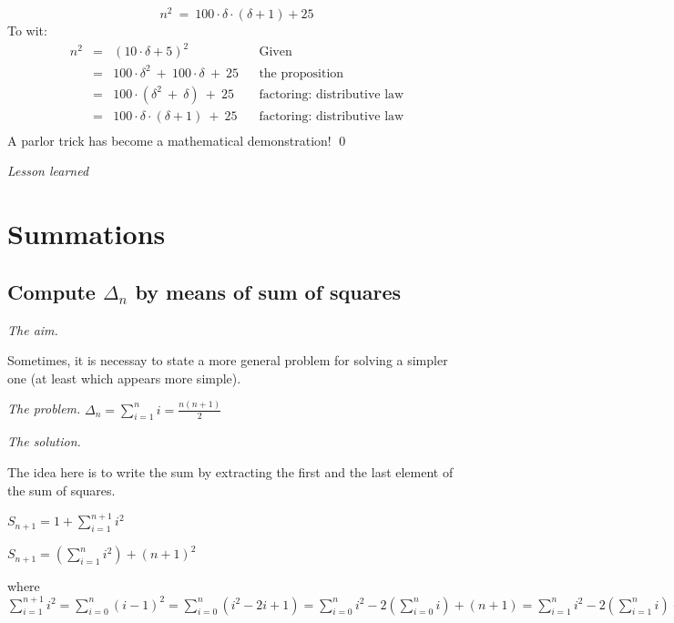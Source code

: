 \[ n^2 \ = \ 100 \cdot \delta \cdot (\delta+1) + 25 \]
To wit: 
\[
\begin{array}{lclll}
n^2 & = & (10 \cdot \delta + 5)^2 & & \mbox{Given} \\
    & = & 100 \cdot \delta^2 \ + \ 100 \cdot \delta \ + \ 25
              & & \mbox{the proposition} \\
    & = & 100 \cdot (\delta^2 \ + \ \delta) \ + \ 25
              & & \mbox{factoring: distributive law} \\
    & = & 100 \cdot \delta \cdot (\delta + 1) \ + \ 25
              & & \mbox{factoring: distributive law} \\
\end{array}
\]
A parlor trick has become a mathematical demonstration!
\qed
\medskip

\noindent \textit{Lesson learned}



\section{Summations}


\subsection{Compute $\Delta_n$ by means of sum of squares}

\noindent \textit{The aim.}

Sometimes, it is necessay to state a more general problem for solving a simpler one (at least which appears more simple).
\medskip

\noindent \textit{The problem.}
$\Delta_n = \sum_{i=1}^{n} i = \frac{n(n+1)}{2}$
\medskip

\noindent \textit{The solution.}

The idea here is to write the sum by extracting the first and the last element
of the sum of squares.
\medskip

$S_{n+1} = 1 + \sum_{i=1}^{n+1} i^2$

$S_{n+1} = (\sum_{i=1}^{n} i^2) + (n+1)^2$

where $\sum_{i=1}^{n+1} i^2 
= \sum_{i=0}^{n} (i-1)^2 
= \sum_{i=0}^{n} (i^2-2i+1) 
= \sum_{i=0}^{n} i^2- 2 ( \sum_{i=0}^{n} i) + (n+1)
= \sum_{i=1}^{n} i^2- 2 ( \sum_{i=1}^{n} i) + (n+1)$

